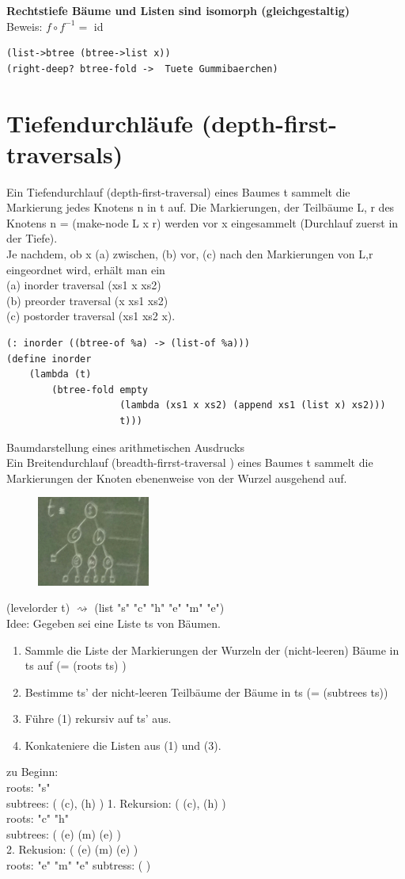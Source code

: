 \documentclass[a4paper, 20pt, openany]{book}
\begin{document}
\textbf{Rechtstiefe Bäume und Listen sind isomorph (gleichgestaltig)}\\
Beweis: $f \circ f^{-1} =$ id\\
\begin{lstlisting}
(list->btree (btree->list x))
(right-deep? btree-fold ->  Tuete Gummibaerchen)
\end{lstlisting}

\section{Tiefendurchläufe (depth-first-traversals)}
Ein Tiefendurchlauf (depth-first-traversal) eines Baumes t sammelt die Markierung jedes Knotens n in t auf. Die Markierungen, der Teilbäume L, r des Knotens n = (make-node L x r) werden vor x eingesammelt (Durchlauf zuerst in der Tiefe).\\
Je nachdem, ob x  (a) zwischen, (b) vor, (c) nach den Markierungen von L,r eingeordnet wird, erhält man  ein \\
(a) inorder traversal (xs1 x xs2)\\
(b) preorder traversal (x xs1 xs2)\\
 (c) postorder traversal (xs1 xs2 x).
\begin{lstlisting}
(: inorder ((btree-of %a) -> (list-of %a)))
(define inorder
	(lambda (t)
		(btree-fold empty
					(lambda (xs1 x xs2) (append xs1 (list x) xs2)))
					t)))

\end{lstlisting}
Baumdarstellung eines arithmetischen Ausdrucks \\
Ein Breitendurchlauf (breadth-firrst-traversal ) eines Baumes t sammelt die Markierungen der Knoten ebenenweise von der Wurzel ausgehend auf.\\

\begin{figure}[ht]
	\centering
  \includegraphics[width=0.33\textwidth, angle=0]{btree-scheme.jpg}
	\label{fig1}
\end{figure}


(levelorder t) $\rightsquigarrow$ (list "s" "c" "h" "e" "m" "e")\\
Idee: Gegeben sei eine Liste ts von Bäumen.
\begin{enumerate}
\item Sammle die Liste der Markierungen der Wurzeln der (nicht-leeren) Bäume in ts auf (= (roots ts) )
\item Bestimme ts' der nicht-leeren Teilbäume der Bäume in ts (= (subtrees ts))
\item Führe (1) rekursiv auf ts' aus.
\item Konkateniere die Listen aus  (1) und (3).
\end{enumerate}

zu Beginn: \\
roots: "s"\\
subtrees: ( (c), (h) )
1. Rekursion: ( (c), (h) )\\
roots: "c" "h"\\
subtrees: ( (e) (m) (e) )\\
2. Rekusion:  ( (e) (m) (e) )\\
roots: "e" "m" "e"
subtress: ( )
\end{document}
